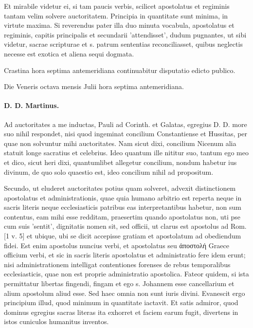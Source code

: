 Et mirabile videtur ei, si tam paucis verbis, scilicet apostolatus et regiminis tantam velim solvere auctoritatem. Principia in quantitate sunt minima, in virtute maxima. Si reverendus pater illa duo minuta vocabula, apostolatus et regiminis, capitis principalis et secundarii 'attendisset', dudum pugnantes, ut sibi videtur, sacrae scripturae et s. patrum sententias reconciliasset, quibus neglectis necesse est exotica et aliena sequi dogmata.

Crastina hora septima antemeridiana continuabitur disputatio edicto publico.

\marginpar{\small[313]} Die Veneris octava mensis Julii hora septima antemeridiana.

\paragraph*{D. D. Martinus.}

Ad auctoritates a me inductas, Pauli ad Corinth. et Galatas, egregius D. D. more suo nihil respondet, nisi quod ingeminat concilium Constantiense et Hussitas, per quae non solvuntur mihi auctoritates. Nam sicut dixi, concilium Nicenum alia statuit longe sacratius et celebrius. Ideo quantum ille nititur suo, tantum ego meo et dico, sicut heri dixi, quantumlibet allegetur concilium, nondum habetur ius divinum, de quo solo quaestio est, ideo concilium nihil ad propositum.

Secundo, ut eluderet auctoritates potius quam solveret, advexit distinctionem apostolatus et administrationis, quae quia humano arbitrio est reperta neque in sacris literis neque ecclesiasticis patribus eas interpretantibus habetur, non sum contentus, eam mihi esse redditam, praesertim quando apostolatus non, uti pse cum suis 'sentit', dignitatis nomen sit, sed officii, ut clarus est apostolus ad Rom. [1 v. 5] et ubique, ubi se dicit accepisse gratiam et apostolatum ad obediendum fidei. Est enim apostolus nuncius verbi, et apostolatus seu ἀποστολή Graece officium verbi, et sic in sacris literis apostolatus et administratio fere idem erunt; nisi administrationem intelligat contentiones forenses de rebus temporalibus ecclesiasticis, quae non est proprie administratio apostolica. Fateor quidem, si ista permittatur libertas fingendi, fingam et ego s. Johannem esse cancellarium et alium apostolum aliud esse. Sed haec omnia non sunt iuris divini. Evanescit ergo principium illud, quod minimum in quantitate iactavit. Et satis admiror, quod dominus egregius sacras literas ita exhorret et faciem earum fugit, divertens in istos cuniculos humanitus inventos.

